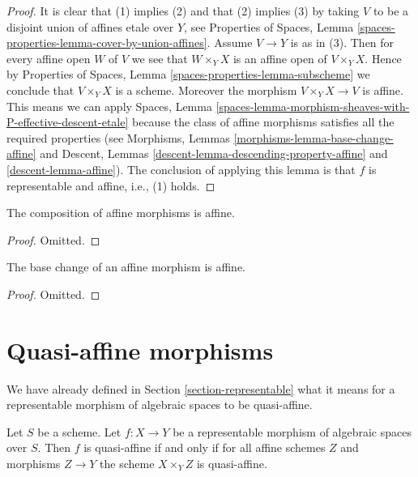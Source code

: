 \begin{proof}
It is clear that (1) implies (2) and that (2) implies (3) by taking
$V$ to be a disjoint union of affines etale over $Y$, see
Properties of Spaces,
Lemma \ref{spaces-properties-lemma-cover-by-union-affines}.
Assume $V \to Y$ is as in (3). Then for every affine open $W$ of $V$ we see
that $W \times_Y X$ is an affine open of $V \times_Y X$. Hence by
Properties of Spaces, Lemma \ref{spaces-properties-lemma-subscheme}
we conclude that $V \times_Y X$ is a scheme. Moreover the morphism
$V \times_Y X \to V$ is affine. This means we can apply
Spaces,
Lemma \ref{spaces-lemma-morphism-sheaves-with-P-effective-descent-etale}
because the class of affine morphisms satisfies all the required
properties (see
Morphisms, Lemmas \ref{morphisms-lemma-base-change-affine} and
Descent, Lemmas \ref{descent-lemma-descending-property-affine}
and \ref{descent-lemma-affine}). The conclusion of applying this lemma
is that $f$ is representable and affine, i.e., (1) holds.
\end{proof}

\begin{lemma}
\label{lemma-composition-affine}
The composition of affine morphisms is affine.
\end{lemma}

\begin{proof}
Omitted.
\end{proof}

\begin{lemma}
\label{lemma-base-change-affine}
The base change of an affine morphism is affine.
\end{lemma}

\begin{proof}
Omitted.
\end{proof}









\section{Quasi-affine morphisms}
\label{section-quasi-affine}

\noindent
We have already defined in Section \ref{section-representable}
what it means for a representable morphism of algebraic spaces
to be quasi-affine.

\begin{lemma}
\label{lemma-quasi-affine-representable}
Let $S$ be a scheme. Let $f : X \to Y$ be a representable
morphism of algebraic spaces over $S$. Then
$f$ is quasi-affine if and only if for all affine schemes $Z$
and morphisms $Z \to Y$ the scheme $X \times_Y Z$ is quasi-affine.
\end{lemma}

